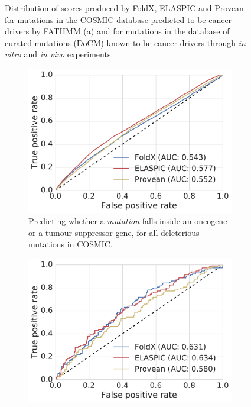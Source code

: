\begin{figure}[tb]
	\caption[Distribution of scores for mutations in oncogenes and tumour suppressor genes.]{
			Distribution of scores produced by FoldX, ELASPIC and Provean for mutations in the COSMIC database predicted to be cancer drivers by FATHMM (a) and for mutations in the database of curated mutations (DoCM) known to be cancer drivers through \textit{in vitro} and \textit{in vivo} experiments.
		}
	\label{fig:validation_cancer_score_distribution}
\end{figure}


\clearpage


\begin{figure}[tb]
	\centering
	\begin{subfigure}[t]{0.48\textwidth}
		\centering
		\includegraphics[width=1\linewidth]{static/elaspic_training_set/validation_cancer/roc_curve_full.pdf}
		\caption{
			Predicting whether a \textit{mutation} falls inside an oncogene or a tumour suppressor gene, for all deleterious mutations in COSMIC.
		}
		\label{fig:validation_cancer_full}
		\vspace*{10mm}
	\end{subfigure}%
	\hspace*{5mm}
	\begin{subfigure}[t]{0.48\textwidth}
		\centering
		\includegraphics[width=1\linewidth]{static/elaspic_training_set/validation_cancer/roc_curve_bygene_full.pdf}

\end{subfigure}
\end{figure}

